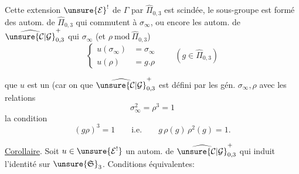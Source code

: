 
Cette extension $\unsure{\mathcal E}^{!}$ de $\Gamma$ par $\widehat{\Pi}_{0,3}$ est
scindée, le sous-groupe  est formé
des autom. de $\widehat{\Pi}_{0,3}$ qui commutent à $\sigma_\infty$,
ou encore les autom. de $\widehat{\unsure{\mathcal C|\mathcal G}}_{0,3}^{+}$ qui
  $\sigma_\infty$ (et  $\rho\ \mathrm{mod}\ \widehat{\Pi}_{0,3}$)
\[
\left\{
\begin{aligned}
u(\sigma_\infty)&=\sigma_\infty\\
u(\rho)&=g.\rho
\end{aligned}
\right.
\qquad(g\in\widehat{\Pi}_{0,3})
\tag{36}
\]


 que $u$ est un  (car on 
que $\widehat{\unsure{\mathcal C|\mathcal G}}_{0,3}^{+}$ est défini par les gén. $\sigma_\infty,\rho$
avec les relations
\begin{equation}
\sigma_\infty^2=\rho^3=1
\tag{37}
\end{equation}
 la condition
\begin{equation}
(g\rho)^3=1\qquad\text{i.e.}\qquad g\,\rho(g)\,\rho^2(g)=1.
\tag{38}
\end{equation}


\uline{Corollaire}. Soit $u\in\unsure{\mathcal E^{!}}$ un autom. de
$\widehat{\unsure{\mathcal C|\mathcal G}}_{0,3}^{+}$ qui induit l'identité sur $\unsure{\mathfrak S}_3$.
Conditions équivalentes:

